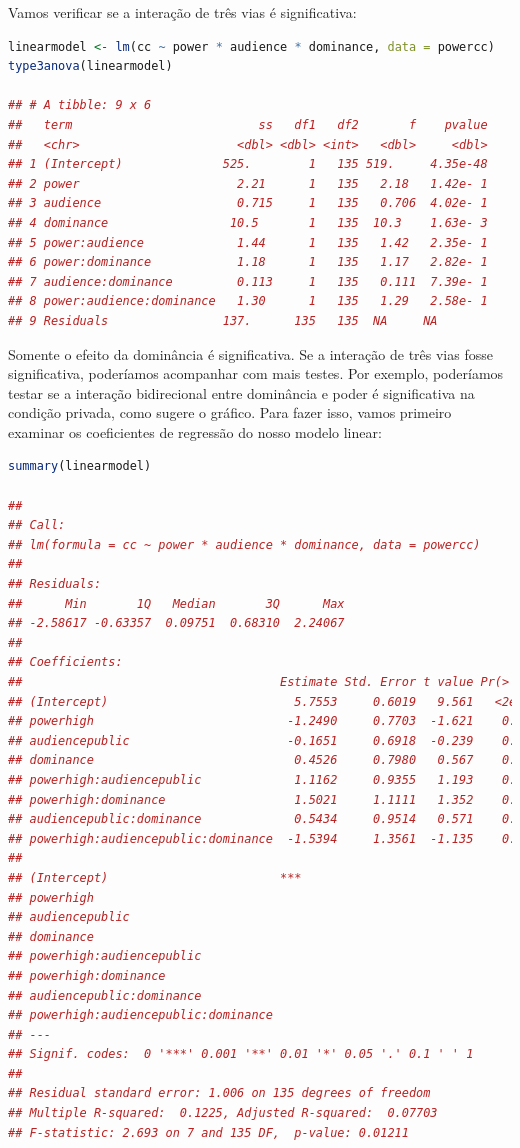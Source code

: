 \documentclass{article}
\begin{document}
Vamos verificar se a interação de três vias é significativa:

\begin{lstlisting}[language=R]
linearmodel <- lm(cc ~ power * audience * dominance, data = powercc)
type3anova(linearmodel)

## # A tibble: 9 x 6
##   term                          ss   df1   df2       f    pvalue
##   <chr>                      <dbl> <dbl> <int>   <dbl>     <dbl>
## 1 (Intercept)              525.        1   135 519.     4.35e-48
## 2 power                      2.21      1   135   2.18   1.42e- 1
## 3 audience                   0.715     1   135   0.706  4.02e- 1
## 4 dominance                 10.5       1   135  10.3    1.63e- 3
## 5 power:audience             1.44      1   135   1.42   2.35e- 1
## 6 power:dominance            1.18      1   135   1.17   2.82e- 1
## 7 audience:dominance         0.113     1   135   0.111  7.39e- 1
## 8 power:audience:dominance   1.30      1   135   1.29   2.58e- 1
## 9 Residuals                137.      135   135  NA     NA

\end{lstlisting}

Somente o efeito da dominância é significativa. Se a interação de três vias fosse significativa, poderíamos acompanhar com mais testes. Por exemplo, poderíamos testar se a interação bidirecional entre dominância e poder é significativa na condição privada, como sugere o gráfico. Para fazer isso, vamos primeiro examinar os coeficientes de regressão do nosso modelo linear:

\begin{lstlisting}[language=R]
summary(linearmodel)

## 
## Call:
## lm(formula = cc ~ power * audience * dominance, data = powercc)
## 
## Residuals:
##      Min       1Q   Median       3Q      Max 
## -2.58617 -0.63357  0.09751  0.68310  2.24067 
## 
## Coefficients:
##                                    Estimate Std. Error t value Pr(>|t|)
## (Intercept)                          5.7553     0.6019   9.561   <2e-16
## powerhigh                           -1.2490     0.7703  -1.621    0.107
## audiencepublic                      -0.1651     0.6918  -0.239    0.812
## dominance                            0.4526     0.7980   0.567    0.572
## powerhigh:audiencepublic             1.1162     0.9355   1.193    0.235
## powerhigh:dominance                  1.5021     1.1111   1.352    0.179
## audiencepublic:dominance             0.5434     0.9514   0.571    0.569
## powerhigh:audiencepublic:dominance  -1.5394     1.3561  -1.135    0.258
##                                       
## (Intercept)                        ***
## powerhigh                             
## audiencepublic                        
## dominance                             
## powerhigh:audiencepublic              
## powerhigh:dominance                   
## audiencepublic:dominance              
## powerhigh:audiencepublic:dominance    
## ---
## Signif. codes:  0 '***' 0.001 '**' 0.01 '*' 0.05 '.' 0.1 ' ' 1
## 
## Residual standard error: 1.006 on 135 degrees of freedom
## Multiple R-squared:  0.1225, Adjusted R-squared:  0.07703 
## F-statistic: 2.693 on 7 and 135 DF,  p-value: 0.01211
\end{lstlisting}
\end{document}
